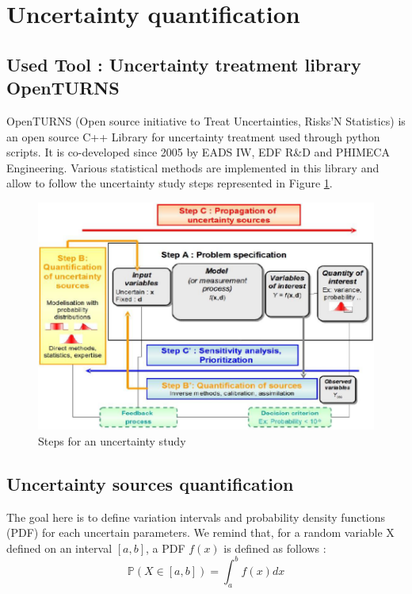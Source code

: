 \section{Uncertainty quantification}
\label{section:uncertainty}
\subsection{Used Tool : Uncertainty treatment library OpenTURNS}
OpenTURNS (Open source initiative to Treat Uncertainties, Risks'N Statistics) \cite{bib11} is an open source C++ Library for uncertainty treatment used through python scripts. It is co-developed since 2005 by EADS IW, EDF R\&D and PHIMECA Engineering. Various statistical methods are implemented in this library and allow to follow the uncertainty study steps \cite{bib18} represented in Figure \ref{fig:uncertainty_diagram}.
\begin{figure}[h!]
    \centering
    \includegraphics[trim={0 0 0 0},clip,scale=0.5]{Images/Uncertainty_diagram}
    \vspace{-0.2cm}
    \caption{Steps for an uncertainty study}
    \label{fig:uncertainty_diagram}
    \vspace{-0.5cm}
\end{figure}

\subsection{Uncertainty sources quantification}
\label{subsection:quantification}
The goal here is to define variation intervals and probability density functions (PDF) for each uncertain parameters. We remind that, for a random variable X defined on an interval $[a,b]$, a PDF $f(x)$ is defined as follows :
\begin{equation}
\mathbb{P}(X \in [a,b])=\int_a^b f(x)dx
\end{equation}

